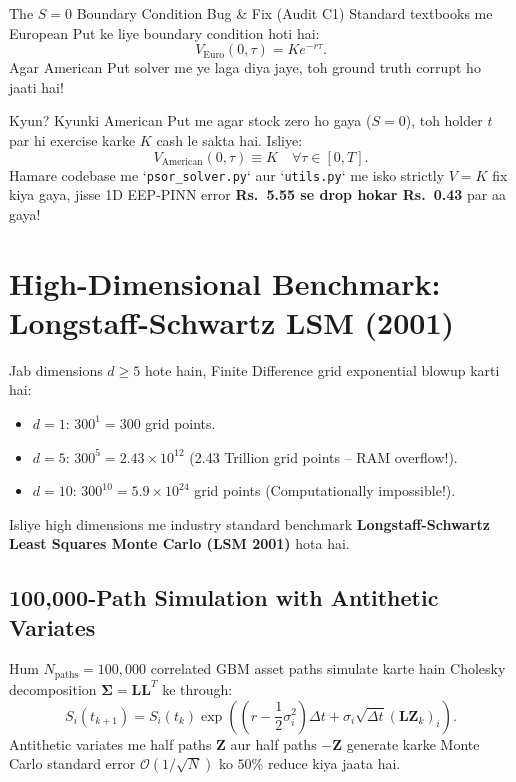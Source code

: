 \documentclass[11pt,a4paper,oneside]{book}
\begin{document}
\begin{auditbox}{The $S=0$ Boundary Condition Bug \& Fix (Audit C1)}
Standard textbooks me European Put ke liye boundary condition hoti hai:
\begin{equation}
    V_{\text{Euro}}(0, \tau) = K e^{-r\tau}.
\end{equation}
Agar American Put solver me ye laga diya jaye, toh ground truth corrupt ho jaati hai! 

Kyun? Kyunki American Put me agar stock zero ho gaya ($S=0$), toh holder $t$ par hi exercise karke $K$ cash le sakta hai. Isliye:
\begin{equation}
    \boxed{V_{\text{American}}(0, \tau) \equiv K \quad \forall \tau \in [0, T].}
\end{equation}
Hamare codebase me `\texttt{psor\_solver.py}` aur `\texttt{utils.py}` me isko strictly $V=K$ fix kiya gaya, jisse 1D EEP-PINN error \textbf{Rs.~5.55 se drop hokar Rs.~0.43} par aa gaya!
\end{auditbox}

\section{High-Dimensional Benchmark: Longstaff-Schwartz LSM (2001)}
Jab dimensions $d \ge 5$ hote hain, Finite Difference grid exponential blowup karti hai:
\begin{itemize}
    \item $d=1$: $300^1 = 300$ grid points.
    \item $d=5$: $300^5 = 2.43 \times 10^{12}$ (2.43 Trillion grid points -- RAM overflow!).
    \item $d=10$: $300^{10} = 5.9 \times 10^{24}$ grid points (Computationally impossible!).
\end{itemize}
Isliye high dimensions me industry standard benchmark \textbf{Longstaff-Schwartz Least Squares Monte Carlo (LSM 2001)} hota hai.

\subsection{100,000-Path Simulation with Antithetic Variates}
Hum $N_{\text{paths}} = 100,000$ correlated GBM asset paths simulate karte hain Cholesky decomposition $\mathbf{\Sigma} = \mathbf{L}\mathbf{L}^T$ ke through:
\begin{equation}
    S_i(t_{k+1}) = S_i(t_k) \exp \left( \left(r - \frac{1}{2}\sigma_i^2\right)\Delta t + \sigma_i \sqrt{\Delta t} (\mathbf{L}\mathbf{Z}_k)_i \right).
\end{equation}
Antithetic variates me half paths $\mathbf{Z}$ aur half paths $-\mathbf{Z}$ generate karke Monte Carlo standard error $\mathcal{O}(1/\sqrt{N})$ ko $50\%$ reduce kiya jaata hai.
\end{document}
